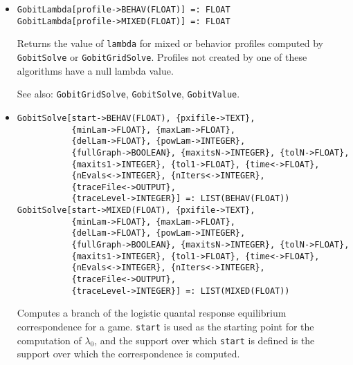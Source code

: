 \begin{itemize}
\item{}
\protect \large \begin{verbatim}
GobitLambda[profile->BEHAV(FLOAT)] =: FLOAT
GobitLambda[profile->MIXED(FLOAT)] =: FLOAT
\end{verbatim}\normalsize

\bd
Returns the value of \verb+lambda+ for mixed or behavior profiles
computed by \verb+GobitSolve+ or \verb+GobitGridSolve+.  Profiles not
created by one of these algorithms have a null lambda value.
\item
[See also:] \verb+GobitGridSolve+, \verb+GobitSolve+, \verb+GobitValue+.
\ed

\item{}
\protect \large \begin{verbatim}
GobitSolve[start->BEHAV(FLOAT), {pxifile->TEXT},
           {minLam->FLOAT}, {maxLam->FLOAT},
           {delLam->FLOAT}, {powLam->INTEGER},
           {fullGraph->BOOLEAN}, {maxitsN->INTEGER}, {tolN->FLOAT},
           {maxits1->INTEGER}, {tol1->FLOAT}, {time<->FLOAT},
           {nEvals<->INTEGER}, {nIters<->INTEGER},
           {traceFile<->OUTPUT},
           {traceLevel->INTEGER}] =: LIST(BEHAV(FLOAT))
GobitSolve[start->MIXED(FLOAT), {pxifile->TEXT},
           {minLam->FLOAT}, {maxLam->FLOAT},
           {delLam->FLOAT}, {powLam->INTEGER},
           {fullGraph->BOOLEAN}, {maxitsN->INTEGER}, {tolN->FLOAT},
           {maxits1->INTEGER}, {tol1->FLOAT}, {time<->FLOAT},
           {nEvals<->INTEGER}, {nIters<->INTEGER},
           {traceFile<->OUTPUT},
           {traceLevel->INTEGER}] =: LIST(MIXED(FLOAT))
\end{verbatim}\normalsize

\bd 
Computes a branch of the logistic quantal response equilibrium
correspondence for a game. \verb+start+ is
used as the starting point for the computation of $\lambda_{0}$, and
the support over which \verb+start+ is defined is the support over
which the correspondence is computed.


\end{itemize}
